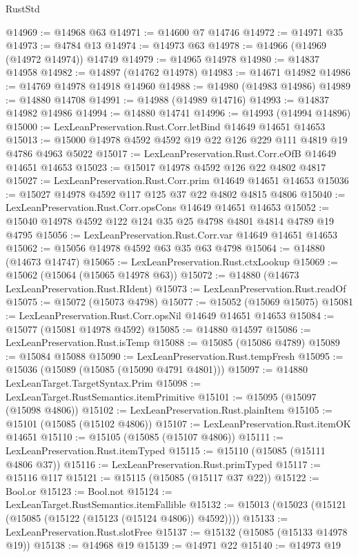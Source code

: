 \begin{lexlean}{RustStd}
\begin{coremodule}
@14969 := @14968 @63
@14971 := @14600 @7 @14746
@14972 := @14971 @35
@14973 := @4784 @13
@14974 := @14973 @63
@14978 := @14966 (@14969 (@14972 @14974)) @14749
@14979 := @14965 @14978
@14980 := @14837 @14958
@14982 := @14897 (@14762 @14978)
@14983 := @14671 @14982
@14986 := @14769 @14978 @14918 @14960
@14988 := @14980 (@14983 @14986)
@14989 := @14880 @14708
@14991 := @14988 (@14989 @14716)
@14993 := @14837 @14982 @14986
@14994 := @14880 @14741
@14996 := @14993 (@14994 @14896)
@15000 := LexLeanPreservation.Rust.Corr.letBind @14649 @14651 @14653
@15013 := @15000 @14978 @4592 @4592 @19 @22 @126 @229 @111 @4819 @19 @4786 @4963 @5022
@15017 := LexLeanPreservation.Rust.Corr.eOfB @14649 @14651 @14653
@15023 := @15017 @14978 @4592 @126 @22 @4802 @4817
@15027 := LexLeanPreservation.Rust.Corr.prim @14649 @14651 @14653
@15036 := @15027 @14978 @4592 @117 @125 @37 @22 @4802 @4815 @4806
@15040 := LexLeanPreservation.Rust.Corr.opsCons @14649 @14651 @14653
@15052 := @15040 @14978 @4592 @122 @124 @35 @25 @4798 @4801 @4814 @4789 @19 @4795
@15056 := LexLeanPreservation.Rust.Corr.var @14649 @14651 @14653
@15062 := @15056 @14978 @4592 @63 @35 @63 @4798
@15064 := @14880 (@14673 @14747)
@15065 := LexLeanPreservation.Rust.ctxLookup
@15069 := @15062 (@15064 (@15065 @14978 @63))
@15072 := @14880 (@14673 LexLeanPreservation.Rust.RIdent)
@15073 := LexLeanPreservation.Rust.readOf
@15075 := @15072 (@15073 @4798)
@15077 := @15052 (@15069 @15075)
@15081 := LexLeanPreservation.Rust.Corr.opsNil @14649 @14651 @14653
@15084 := @15077 (@15081 @14978 @4592)
@15085 := @14880 @14597
@15086 := LexLeanPreservation.Rust.isTemp
@15088 := @15085 (@15086 @4789)
@15089 := @15084 @15088
@15090 := LexLeanPreservation.Rust.tempFresh
@15095 := @15036 (@15089 (@15085 (@15090 @4791 @4801)))
@15097 := @14880 LexLeanTarget.TargetSyntax.Prim
@15098 := LexLeanTarget.RustSemantics.itemPrimitive
@15101 := @15095 (@15097 (@15098 @4806))
@15102 := LexLeanPreservation.Rust.plainItem
@15105 := @15101 (@15085 (@15102 @4806))
@15107 := LexLeanPreservation.Rust.itemOK @14651
@15110 := @15105 (@15085 (@15107 @4806))
@15111 := LexLeanPreservation.Rust.itemTyped
@15115 := @15110 (@15085 (@15111 @4806 @37))
@15116 := LexLeanPreservation.Rust.primTyped
@15117 := @15116 @117
@15121 := @15115 (@15085 (@15117 @37 @22))
@15122 := Bool.or
@15123 := Bool.not
@15124 := LexLeanTarget.RustSemantics.itemFallible
@15132 := @15013 (@15023 (@15121 (@15085 (@15122 (@15123 (@15124 @4806)) @4592))))
@15133 := LexLeanPreservation.Rust.slotFree
@15137 := @15132 (@15085 (@15133 @14978 @19))
@15138 := @14968 @19
@15139 := @14971 @22
@15140 := @14973 @19

\end{coremodule}
\end{lexlean}
